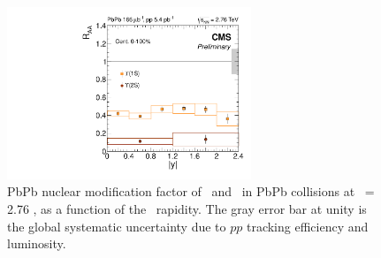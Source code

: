 \begin{figure}[h]
  \begin{centering}  
    \includegraphics[width=0.65\textwidth]{Chapters/aUpsilon/RAA_Rap-1.pdf}
    \caption{PbPb nuclear modification factor of \PgUa\ and \PgUb\ in PbPb collisions
      at \snn\ = 2.76 \TeV, as a function of the \PgU\ rapidity. The gray error bar at unity is the global
      systematic uncertainty due to $pp$ tracking efficiency and luminosity.}
    \label{fig:raarap}
  \end{centering}  
\end{figure}

